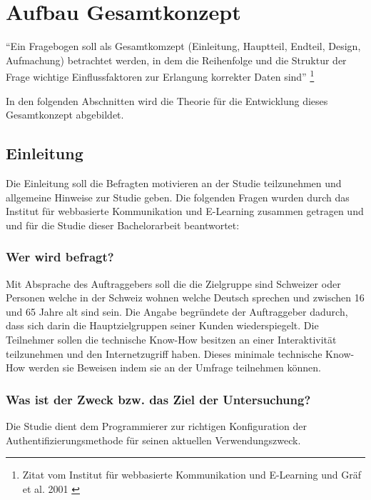 \section{Aufbau Gesamtkonzept}\label{aufbau-gesamtkonzept}

``Ein Fragebogen soll als Gesamtkomzept (Einleitung, Hauptteil, Endteil,
Design, Aufmachung) betrachtet werden, in dem die Reihenfolge und die
Struktur der Frage wichtige Einflussfaktoren zur Erlangung korrekter
Daten sind'' \footnote{Zitat vom Institut für webbasierte Kommunikation
  und E-Learning und Gräf et al. 2001 \autocite{fragebogen}}

In den folgenden Abschnitten wird die Theorie für die Entwicklung dieses
Gesamtkonzept abgebildet.

\subsection{Einleitung}\label{einleitung}

Die Einleitung soll die Befragten motivieren an der Studie teilzunehmen
und allgemeine Hinweise zur Studie geben. Die folgenden Fragen wurden
durch das Institut für webbasierte Kommunikation und E-Learning zusammen
getragen \autocite{fragebogen} und und für die Studie dieser
Bachelorarbeit beantwortet:

\subsubsection{Wer wird befragt?}\label{wer-wird-befragt}

Mit Absprache des Auftraggebers soll die die Zielgruppe sind Schweizer
oder Personen welche in der Schweiz wohnen welche Deutsch sprechen und
zwischen 16 und 65 Jahre alt sind sein. Die Angabe begründete der
Auftraggeber dadurch, dass sich darin die Hauptzielgruppen seiner Kunden
wiederspiegelt. Die Teilnehmer sollen die technische Know-How besitzen
an einer Interaktivität teilzunehmen und den Internetzugriff haben.
Dieses minimale technische Know-How werden sie Beweisen indem sie an der
Umfrage teilnehmen können.

\subsubsection{Was ist der Zweck bzw. das Ziel der
Untersuchung?}\label{was-ist-der-zweck-bzw.-das-ziel-der-untersuchung}

Die Studie dient dem Programmierer zur richtigen Konfiguration der
Authentifizierungsmethode für seinen aktuellen Verwendungszweck.

